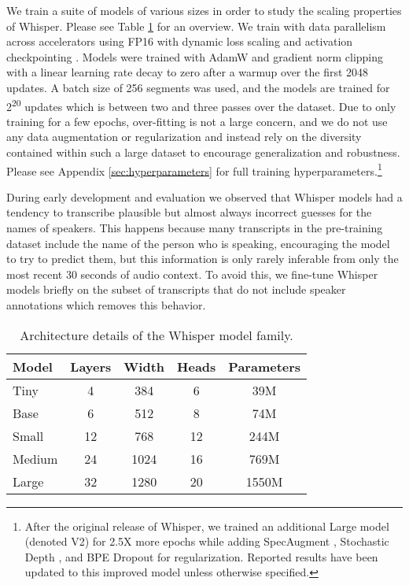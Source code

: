 We train a suite of models of various sizes in order to study the scaling properties of Whisper. Please see Table \ref{tab:models} for an overview. We train with data parallelism across accelerators using FP16 with dynamic loss scaling and activation checkpointing \cite{griewank2000algorithm, chen2016training}. Models were trained with AdamW \cite{loshchilov2017decoupled} and gradient norm clipping \cite{pascanu2013difficulty} with a linear learning rate decay to zero after a warmup over the first 2048 updates. A batch size of 256 segments was used, and the models are trained for 2\textsuperscript{20} updates which is between two and three passes over the dataset. Due to only training for a few epochs, over-fitting is not a large concern, and we do not use any data augmentation or regularization and instead rely on the diversity contained within such a large dataset to encourage generalization and robustness. Please see Appendix \ref{sec:hyperparameters} for full training hyperparameters.\footnote{After the original release of Whisper, we trained an additional Large model (denoted V2) for 2.5X more epochs while adding SpecAugment \cite{park2019specaugment}, Stochastic Depth \cite{huang2016deep}, and BPE Dropout \cite{provilkov2019bpe} for regularization. Reported results have been updated to this improved model unless otherwise specified.}

During early development and evaluation we observed that Whisper models had a tendency to transcribe plausible but almost always incorrect guesses for the names of speakers. This happens because many transcripts in the pre-training dataset include the name of the person who is speaking, encouraging the model to try to predict them, but this information is only rarely inferable from only the most recent 30 seconds of audio context. To avoid this, we fine-tune Whisper models briefly on the subset of transcripts that do not include speaker annotations which removes this behavior.

\begin{table}[t]
\centering
\small
\begin{tabular}{l|cccc} \toprule
    Model & Layers & Width & Heads & Parameters \\
    \midrule
    Tiny & 4 & 384 & 6 & 39M \\
    Base & 6 & 512 & 8 & 74M \\
    Small & 12 & 768 & 12 & 244M \\
    Medium & 24 & 1024 & 16 & 769M \\
    Large & 32 & 1280 & 20 & 1550M \\
    \bottomrule
\end{tabular}
\caption{Architecture details of the Whisper model family.}\label{tab:models}
\end{table}

